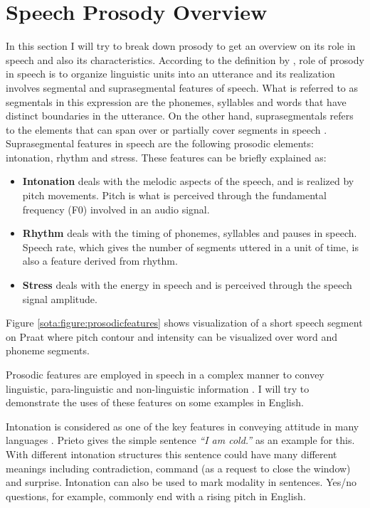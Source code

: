 \section{Speech Prosody Overview}
\label{sota:prosody}
In this section I will try to break down prosody to get an overview on its role in speech and also its characteristics. According to the definition by \cite{Fujisaki97}, role of prosody in speech is to organize linguistic units into an utterance and its realization involves segmental and suprasegmental features of speech. What is referred to as segmentals in this expression are the phonemes, syllables and words that have distinct boundaries in the utterance. On the other hand, suprasegmentals refers to the elements that can span over or partially cover segments in speech \citep{palmer}. Suprasegmental features in speech are the following prosodic elements: intonation, rhythm and stress. These features can be briefly explained as:

\begin{itemize}
    \item \textbf{Intonation} deals with the melodic aspects of the speech, and is realized by pitch movements. Pitch is what is perceived through the fundamental frequency (F0) involved in an audio signal. 
    \item \textbf{Rhythm} deals with the timing of phonemes, syllables and pauses in speech. Speech rate, which gives the number of segments uttered in a unit of time, is also a feature derived from rhythm.
    \item \textbf{Stress} deals with the energy in speech and is perceived through the speech signal amplitude. 
\end{itemize}

Figure \ref{sota:figure:prosodicfeatures} shows visualization of a short speech segment on Praat where pitch contour and intensity can be visualized over word and phoneme segments.  

Prosodic features are employed in speech in a complex manner to convey linguistic, para-linguistic and non-linguistic information \citep{Fujisaki97}. I will try to demonstrate the uses of these features on some examples in English. 

Intonation is considered as one of the key features in conveying attitude in many languages \citep{Prieto}. Prieto gives the simple sentence \textit{``I am cold.''} as an example for this. With different intonation structures this sentence could have many different meanings including contradiction, command (as a request to close the window) and surprise. Intonation can also be used to mark modality in sentences.  Yes/no questions, for example, commonly end with a rising pitch in English. 


